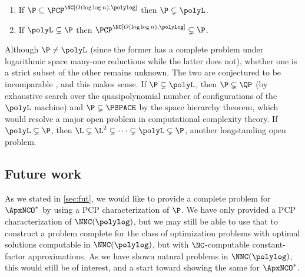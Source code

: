\documentclass{article}
\begin{document}
\begin{theorem}\label{thm:pinpcp}
  \mbox{}
  \begin{enumerate}
  \item If $\P \subseteq \PCP^\NC[O(\log \log n), \polylog]$ then $\P \subsetneq \polyL$.
  \item If $\polyL \subsetneq \P$ then $\PCP^\NC[O(\log \log n), \polylog] \subsetneq \P$.
  \end{enumerate}
\end{theorem}
Although $\P \neq \polyL$ (since the former has a complete problem under logarithmic space many-one reductions while the latter does not), whether one is a strict subset of the other remains unknown.
The two are conjectured to be incomparable \autocite[Section~2.5.1]{johnson90}, and this makes sense.
If $\P \subsetneq \polyL$, then $\P \subsetneq \QP$ (by exhaustive search over the quasipolynomial number of configurations of the $\polyL$ machine) and $\P \subsetneq \PSPACE$ by the space hierarchy theorem, which would resolve a major open problem in computational complexity theory.
If $\polyL \subsetneq \P$, then $\L \subsetneq \L^2 \subsetneq \dotsb \subsetneq \polyL \subsetneq \P$, another longstanding open problem.

\subsection{Future work}

As we stated in \autoref{sec:fut}, we would like to provide a complete problem for $\ApxNCO^*$ by using a PCP characterization of $\P$.
We have only provided a PCP characterization of $\NNC(\polylog)$, but we may still be able to use that to construct a problem complete for the class of optimization problems with optimal solutions computable in $\NNC(\polylog)$, but with $\NC$-computable constant-factor approximations.
As we have shown natural problems in $\NNC(\polylog)$, this would still be of interest, and a start toward showing the same for $\ApxNCO^*$.

\printbibliography
\end{document}
